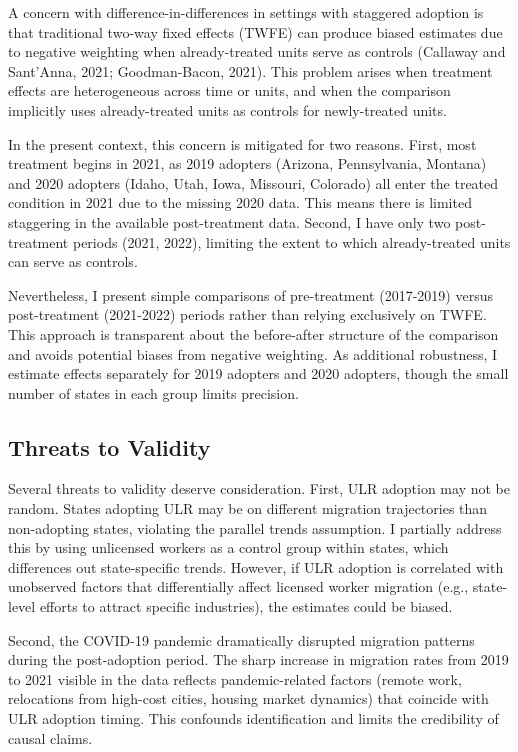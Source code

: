 \documentclass[12pt]{article}
\begin{document}
A concern with difference-in-differences in settings with staggered adoption is that traditional two-way fixed effects (TWFE) can produce biased estimates due to negative weighting when already-treated units serve as controls (Callaway and Sant'Anna, 2021; Goodman-Bacon, 2021). This problem arises when treatment effects are heterogeneous across time or units, and when the comparison implicitly uses already-treated units as controls for newly-treated units.

In the present context, this concern is mitigated for two reasons. First, most treatment begins in 2021, as 2019 adopters (Arizona, Pennsylvania, Montana) and 2020 adopters (Idaho, Utah, Iowa, Missouri, Colorado) all enter the treated condition in 2021 due to the missing 2020 data. This means there is limited staggering in the available post-treatment data. Second, I have only two post-treatment periods (2021, 2022), limiting the extent to which already-treated units can serve as controls.

Nevertheless, I present simple comparisons of pre-treatment (2017-2019) versus post-treatment (2021-2022) periods rather than relying exclusively on TWFE. This approach is transparent about the before-after structure of the comparison and avoids potential biases from negative weighting. As additional robustness, I estimate effects separately for 2019 adopters and 2020 adopters, though the small number of states in each group limits precision.

\subsection{Threats to Validity}

Several threats to validity deserve consideration. First, ULR adoption may not be random. States adopting ULR may be on different migration trajectories than non-adopting states, violating the parallel trends assumption. I partially address this by using unlicensed workers as a control group within states, which differences out state-specific trends. However, if ULR adoption is correlated with unobserved factors that differentially affect licensed worker migration (e.g., state-level efforts to attract specific industries), the estimates could be biased.

Second, the COVID-19 pandemic dramatically disrupted migration patterns during the post-adoption period. The sharp increase in migration rates from 2019 to 2021 visible in the data reflects pandemic-related factors (remote work, relocations from high-cost cities, housing market dynamics) that coincide with ULR adoption timing. This confounds identification and limits the credibility of causal claims.
\end{document}
